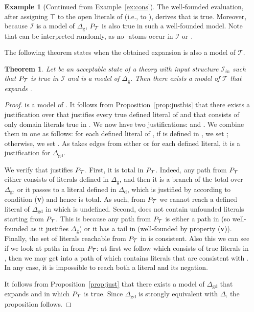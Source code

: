\documentclass[11pt]{article}
\newcommand{\m}[1]{\ensuremath{#1}\xspace}
\newcommand{\true}{\m{\top}}
\newcommand{\I}{\m{\mathcal{I}}}
\newcommand{\Iin}{\m{\I_{in}}}
\newcommand{\theory}{\m{\mathcal{T}}}
\newcommand{\D}{\m{\Delta}}
\theoremstyle{plain}
\newtheorem{theorem}[thm]{Theorem}
\theoremstyle{definition}
\theoremstyle{example_basic}
\newtheorem{example}[thm]{Example}
\theoremstyle{example_contd}
\theoremstyle{plain}
\newcommand{\Dg}{\ensuremath{\D_\text{g}}\xspace}
\newcommand{\Dd}{\ensuremath{\D_\text{d}}\xspace}
\newcommand{\Dgd}{\ensuremath{\D_\text{gd}}\xspace}
\newcommand{\pt}{\ensuremath{P_\text{\theory}}\xspace}
\newcommand{\tbf}[1]{\textbf{#1}}
\newcommand{\change}[1]{#1}
\begin{document}
\begin{example}[Continued from Example~\ref{ex:cons}]
The well-founded evaluation, after assigning \true to the open
literals of \jgraph (i.e., to ), derives that
 is true. Moreover, because \I is a model of \Dg, \pt is also true
in such a well-founded model. Note that  can be interpreted 
randomly, as no -atoms occur in \I or \jgraph.
\end{example}

The following theorem states when the obtained expansion is also a model of \theory.

\begin{theorem}\label{theo:acceptablemodel}
Let  be an acceptable state of a theory
 with input structure \Iin such that \pt is
true in \I and  is a model of \Dg.
Then there exists a model \M of \theory that expands .
\end{theorem}
\begin{proof}
 is a model of . It follows from
Proposition~\ref{prop:justbis}  that there exists a justification
 over  that justifies  every true defined literal of 
and that consists of only domain literals true in
. We now have two justifications:  and
. We combine them in one  as follows: for each defined
literal  of , if  is defined in , we set
; otherwise, we set  . 
\change{As  takes edges from either  or  for each defined literal, it is a justification for \Dgd.}

We verify that  justifies \pt. First, it is total in \pt. Indeed, any path from \pt either consists of literals defined in \Dg, and then it is a branch of the total  over \Dg, or it passes to a literal  defined in \Dd, which is justified by  according to condition (\tbf{v}) and hence  is total. As such, from \pt we cannot reach a defined literal of \Dgd in which  is undefined. \change{Second,  does not contain unfounded literals starting from \pt. This is because any path from \pt is either a path in  (so well-founded as it justifies \Dg) or it has a tail in \jgraph (well-founded by property (\tbf{v}))}. Finally, the set of literals reachable from \pt in  is consistent. Also this we can see if we look at paths in  from \pt: at first we follow  which consists of true literals in , then we may get into a path of \jgraph which contains literals that are consistent with . In any case, it is impossible to reach both a literal and its negation. 

It follows from Proposition~\ref{prop:just} that there exists a model of \Dgd that expands   and in which \pt is true. Since \Dgd is strongly equivalent with \D, the proposition follows.
\end{proof}
\end{document}
